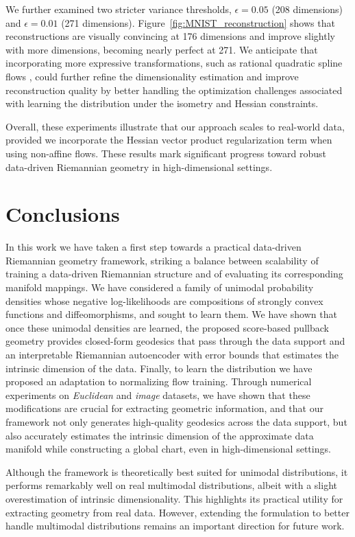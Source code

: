 We further examined two stricter variance thresholds, \(\epsilon = 0.05\) (208 dimensions) and \(\epsilon = 0.01\) (271 dimensions). Figure~\ref{fig:MNIST_reconstruction} shows that reconstructions are visually convincing at 176 dimensions and improve slightly with more dimensions, becoming nearly perfect at 271. We anticipate that incorporating more expressive transformations, such as rational quadratic spline flows \cite{durkan2019neural}, could further refine the dimensionality estimation and improve reconstruction quality by better handling the optimization challenges associated with learning the distribution under the isometry and Hessian constraints.
    
Overall, these experiments illustrate that our approach scales to real-world data, provided we incorporate the Hessian vector product regularization term when using non-affine flows. These results mark significant progress toward robust data-driven Riemannian geometry in high-dimensional settings.

    
\section{Conclusions}
\label{sec:conclusions}

In this work we have taken a first step towards a practical data-driven Riemannian geometry framework, striking a balance between scalability of training a data-driven Riemannian structure and of evaluating its corresponding manifold mappings. We have considered a family of unimodal probability densities whose negative log-likelihoods are compositions of strongly convex functions and diffeomorphisms, and sought to learn them. We have shown that once these unimodal densities are learned, the proposed score-based pullback geometry provides closed-form geodesics that pass through the data support and an interpretable Riemannian autoencoder with error bounds that estimates the intrinsic dimension of the data. Finally, to learn the distribution we have proposed an adaptation to normalizing flow training. Through numerical experiments on \textit{Euclidean} and \textit{image} datasets, we have shown that these modifications are crucial for extracting geometric information, and that our framework not only generates high-quality geodesics across the data support, but also accurately estimates the intrinsic dimension of the approximate data manifold while constructing a global chart, even in high-dimensional settings. 

Although the framework is theoretically best suited for unimodal distributions, it performs remarkably well on real multimodal distributions, albeit with a slight overestimation of intrinsic dimensionality. This highlights its practical utility for extracting geometry from real data. However, extending the formulation to better handle multimodal distributions remains an important direction for future work.

